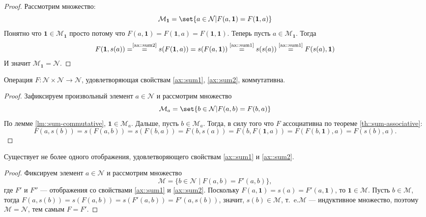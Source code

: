 \documentclass{article}
\newcommand{\ie}{т{.}~e{.}}
\begin{document}
\begin{proof}
    Рассмотрим множество:
    \[
        \mathcal{M}_{\mathbf{1}} =  \set{a \in \mathcal{N} | F(a, \mathbf{1}) = F(\mathbf{1}, a)}
    \]
    Понятно что $\mathbf{1} \in \mathcal{M}_{\mathbf{1}}$ просто потому что $F(a, \mathbf{1}) = F(\mathbf{1}, a) = F(\mathbf{1}, \mathbf{1})$. Теперь пусть $a \in \mathcal{M}_{\mathbf{1}}$. Тогда
    \[
        F(\mathbf{1}, s(a)) = \overset{\text{\eqref{ax::sum2}}}{=} s(F(\mathbf{1}, a)) = s(F(a, \mathbf{1}))  \overset{\text{\eqref{ax::sum1}}}{=} s(s(a))  \overset{\text{\eqref{ax::sum1}}}{=} F(s(a), \mathbf{1})
    \]
    И значит $\mathcal{M}_{\mathbf{1}}  = \mathcal{N}$.
\end{proof}
\begin{theorem}
    \label{th::sum-commutative}
    Операция \( F: \mathcal{N} \times \mathcal{N} \rightarrow \mathcal{N} \), удовлетворяющая свойствам \eqref{ax::sum1}, \eqref{ax::sum2}, коммутативна.    
\end{theorem}
\begin{proof}
    Зафиксируем произвольный элемент $a \in \mathcal{N}$ и рассмотрим множество    
    \[
        \mathcal{M}_{a} =  \set{b \in \mathcal{N} | F(a, b) = F(b, a)}
    \] 
    По лемме \ref{lm::sum-commutative}, $\mathbf{1} \in \mathcal{M}_{a}$. Дальше, пусть $b \in \mathcal{M}_{a}$. Тогда, в силу того что $F$ ассоциативна по теореме \ref{th::sum-associative}:
    \[
        F(a, s(b)) = s(F(a, b)) = s(F(b, a)) = F(b, s(a)) = F(b, F(\mathbf{1}, a)) = F(F(b, \mathbf{1}), a) = F(s(b), a).
    \]
\end{proof}


\begin{theorem}
    \label{th::sum-unique}
    Существует не более одного отображения, удовлетворяющего свойствам \eqref{ax::sum1} и \eqref{ax::sum2}.   
\end{theorem}
\begin{proof}
    Фиксируем элемент \( a \in \mathcal{N} \) и рассмотрим множество
    \[
    \mathcal{M} = \{ b \in \mathcal{N} \mid F(a, b) = F'(a, b) \},
    \]
    где \( F' \) и \( F'' \) --- отображения со свойствами \eqref{ax::sum1} и \eqref{ax::sum2}. Поскольку \( F(a, \mathbf{1}) = s(a) = F'(a, \mathbf{1}) \), то \(\mathbf{1} \in \mathcal{M} \). Пусть \( b \in \mathcal{M} \), тогда \( F(a, s(b)) = s(F(a, b)) = s(F'(a, b)) = F'(a, s(b)) \), значит, \( s(b) \in \mathcal{M} \), \ie \( \mathcal{M} \) --- индуктивное множество, поэтому \( \mathcal{M} = \mathcal{N} \), тем самым \( F = F' \).
\end{proof}
\end{document}
